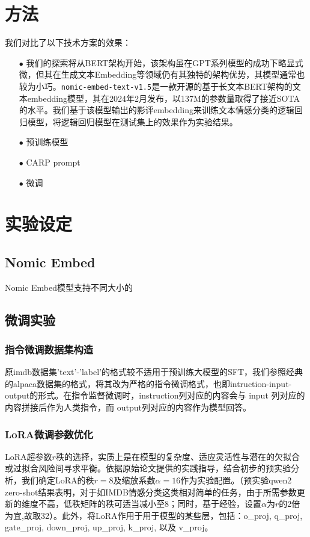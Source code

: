\documentclass{article}
\begin{document}
\section{方法}
我们对比了以下技术方案的效果：
\begin{itemize}
  \item[$\bullet$] 我们的探索将从BERT架构开始，该架构虽在GPT系列模型的成功下略显式微，但其在生成文本Embedding等领域仍有其独特的架构优势，其模型通常也较为小巧。\verb|nomic-embed-text-v1.5|\cite{nomic}是一款开源的基于长文本BERT架构的文本embedding模型，其在2024年2月发布，以137M的参数量取得了接近SOTA的水平。我们基于该模型输出的影评embedding来训练文本情感分类的逻辑回归模型，将逻辑回归模型在测试集上的效果作为实验结果。
  \item[$\bullet$] 预训练模型
  \item[$\bullet$] CARP prompt\cite{CARP}
  \item[$\bullet$] 微调
\end{itemize}








\section{实验设定}
\subsection{Nomic Embed}
Nomic Embed模型支持不同大小的

\subsection{微调实验}
\subsubsection{指令微调数据集构造}
原imdb数据集'text'-'label'的格式较不适用于预训练大模型的SFT，我们参照经典的alpaca数据集的格式，将其改为严格的指令微调格式，也即intruction-input-output的形式。在指令监督微调时，instruction列对应的内容会与 input 列对应的内容拼接后作为人类指令，而 output列对应的内容作为模型回答。
\subsubsection{LoRA微调参数优化}
LoRA超参数\(r\)秩的选择，实质上是在模型的复杂度、适应灵活性与潜在的欠拟合或过拟合风险间寻求平衡。依据原始论文\cite{hu2021lora}提供的实践指导，结合初步的预实验分析，我们确定LoRA的秩\(r=8\)及缩放系数\(\alpha=16\)作为实验配置。（预实验qwen2 zero-shot结果表明，对于如IMDB情感分类这类相对简单的任务，由于所需参数更新的维度不高，低秩矩阵的秩可适当减小至8；同时，基于经验，设置\(\alpha\)为\(r\)的2倍为宜,故取32）。此外，将LoRA作用于用于模型的某些层，包括：o\_proj, q\_proj, gate\_proj, down\_proj, up\_proj, k\_proj, 以及 v\_proj。
\end{document}
